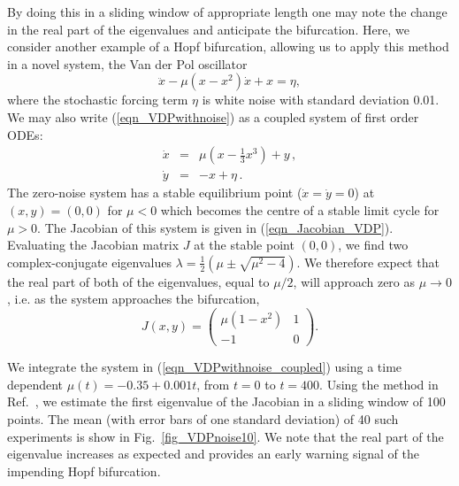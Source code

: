 \documentclass[%
aip,
amsmath,amssymb,
reprint,%
]{revtex4-1}
\newcommand{\noteRed}[1]{{#1}}
\begin{document}
By doing this in a sliding window of appropriate length one may note the change in the real part of the eigenvalues and anticipate the bifurcation. Here, we consider another example of a Hopf bifurcation, allowing us to apply this method in a novel system, the Van der Pol oscillator 
\begin{equation}
\ddot{x} - \mu(x-x^2)\dot{x} + x = \eta,
\label{eqn_VDPwithnoise}
\end{equation} 
where the stochastic forcing term $\eta$ is white noise with standard deviation 0.01. We may also write (\ref{eqn_VDPwithnoise}) as a coupled system of first order ODEs:
\begin{equation}
\begin{array}{rcl}
\dot{x} &=& \mu\left(x - \frac{1}{3}x^3\right)+y\,,\\
\dot{y} &=& -x + \eta\,.
\end{array}
\label{eqn_VDPwithnoise_coupled}
\end{equation} 
The {\noteRed zero-noise} system has a stable equilibrium point ($\dot{x}= \dot{y}= 0$) at $(x,y)= (0,0)$ for $\mu<0$ which becomes the centre of a stable limit cycle for $\mu>0$. The Jacobian of this system is given in (\ref{eqn_Jacobian_VDP}). Evaluating the Jacobian matrix $J$ at the stable point $(0,0)$, we find two complex-conjugate eigenvalues $\lambda = \frac{1}{2}(\mu \pm \sqrt{\mu^2-4})$. We therefore expect that the real part of both of the eigenvalues, equal to $\mu/2$, will approach zero as $\mu\rightarrow 0$, i.e. as the system approaches the bifurcation,
\begin{equation}
J(x,y) = \left(
\begin{array}{cc}
\mu(1-x^2) & 1\\
-1 & 0
\end{array}
\right).
\label{eqn_Jacobian_VDP}
\end{equation} 


We integrate the system in (\ref{eqn_VDPwithnoise_coupled}) using a time dependent $\mu(t) = -0.35 + 0.001t$, from $t=0$ to $t=400$. Using the method in Ref.~, we estimate the first eigenvalue of the Jacobian in a sliding window of 100 points. The mean (with error bars of one standard deviation) of 40 such experiments is show in Fig.~\ref{fig_VDPnoise10}. We note that the real part of the eigenvalue increases as expected and provides an early warning signal of the impending Hopf bifurcation.
\end{document}
